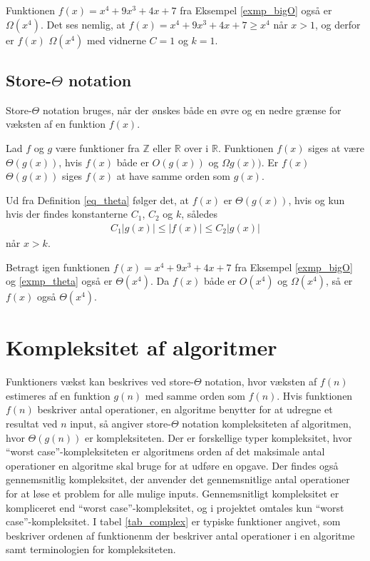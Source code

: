 \begin{exmp}\label{exmp_theta}
Funktionen $f(x)=x^4+9x^3+4x+7$ fra Eksempel \ref{exmp_bigO} også er $\Omega(x^4)$. 
Det ses nemlig, at $f(x)=x^4+9x^3+4x+7 \geq x^4 $ når $x>1$, og derfor er $f(x)$ $\Omega(x^4)$ med vidnerne $C=1$ og $k=1$.
\end{exmp}

\subsection{Store-$\Theta$ notation}
Store-$\Theta$ notation bruges, når der ønskes både en øvre og en nedre grænse for væksten af en funktion $f(x)$. \\
\begin{defn}\label{eq_theta}
	Lad $f$ og $g$ være funktioner fra $\mathbb{Z}$ eller $\mathbb{R}$ over i $\mathbb{R}$. 
Funktionen $f(x)$ siges at være $\Theta (g(x))$, hvis $f(x)$ både er $O(g(x))$ og $\Omega g(x))$. 
	Er $f(x)$ $\Theta (g(x))$ siges $f(x)$ at have samme orden som $g(x)$. 
\end{defn}
Ud fra Definition \ref{eq_theta} følger det, at $f(x)$ er $\Theta (g(x))$, hvis og kun hvis der findes konstanterne $C_1$, $C_2$ og $k$, således
\begin{align}
	C_1 |g(x)| \leq |f(x)| \leq C_2 |g(x)|
\end{align}
når $x>k$. \\
\begin{exmp}
Betragt igen funktionen $f(x)=x^4+9x^3+4x+7$ fra Eksempel \ref{exmp_bigO} og \ref{exmp_theta} også er $\Theta(x^4)$.
Da $f(x)$ både er $O(x^4)$ og $\Omega (x^4)$, så er $f(x)$ også $\Theta (x^4)$.
\end{exmp}

\section{Kompleksitet af algoritmer}
Funktioners vækst kan beskrives ved store-$\Theta$ notation, hvor væksten af $f(n)$ estimeres af en funktion $g(n)$ med samme orden som $f(n)$. 
Hvis funktionen $f(n)$ beskriver antal operationer, en algoritme benytter for at udregne et resultat ved $n$ input, så angiver store-$\Theta$ notation kompleksiteten af algoritmen, hvor $\Theta(g(n))$ er kompleksiteten. 
Der er forskellige typer kompleksitet, hvor “worst case”-kompleksiteten er algoritmens orden af det maksimale antal operationer en algoritme skal bruge for at udføre en opgave. 
Der findes også gennemsnitlig kompleksitet, der anvender det gennemsnitlige antal operationer for at løse et problem for alle mulige inputs. Gennemsnitligt kompleksitet er kompliceret end “worst case”-kompleksitet, og i projektet omtales kun “worst case”-kompleksitet.
I tabel \ref{tab_complex} er typiske funktioner angivet, som beskriver ordenen af funktionenm der beskriver antal operationer i en algoritme samt terminologien for kompleksiteten.\\

